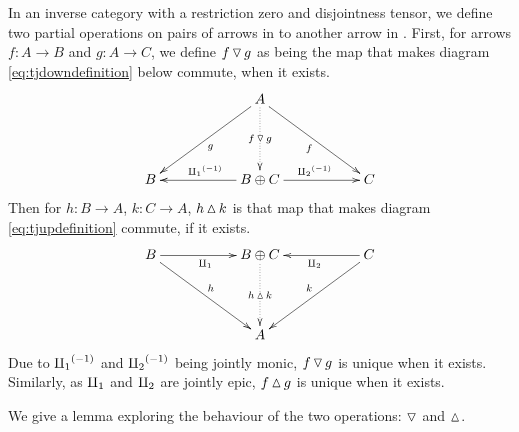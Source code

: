 \begin{definition}\label{def:up_triangle_and_down_triangle}
  In an inverse category \X with a restriction zero and disjointness tensor, we define two partial
  operations on pairs of arrows in \X to another arrow in \X. First, for arrows
  $f:A \to B$ and $g:A \to C$, we define $f\operatorname{\triangledown} g$ as
  being the map that makes diagram \eqref{eq:tjdowndefinition} below commute, when it exists.
  \begin{equation}
    \xymatrix@C+0pt @R+20pt{
      &&A \ar[dll]^{g} \ar[drr]_{f} \ar@{.>}[d]|-{f\tjdown g}\\
      B&&B\+C \ar[ll]_{\icpa} \ar[rr]^{\icpb} && C
      }\label{eq:tjdowndefinition}
  \end{equation}
  Then for $h:B \to A$, $k: C \to A$, $h\operatorname{\vartriangle} k$ is that map that makes diagram
  \eqref{eq:tjupdefinition} commute, if it exists.
  \begin{equation}
    \xymatrix@C+0pt @R+20pt{
      B\ar[rr]_{\cpa} \ar[drr]^{h} &&B\+C   \ar@{.>}[d]|-{h\tjup k}
        && C \ar[ll]^{\cpb} \ar[dll]_{k}\\
      &&A
      }\label{eq:tjupdefinition}
  \end{equation}
  Due to ${\amalg_{1}}^{(-1)}$ and ${\amalg_{2}}^{(-1)}$ being jointly monic, $f\operatorname{\triangledown} g$ is unique when it exists.
  Similarly, as $\amalg_{1}$ and $\amalg_{2}$ are jointly epic, $f\operatorname{\vartriangle} g$ is unique when it exists.
\end{definition}

We give a lemma exploring the
behaviour of the two operations: $\operatorname{\triangledown}$ and $\operatorname{\vartriangle}$.

